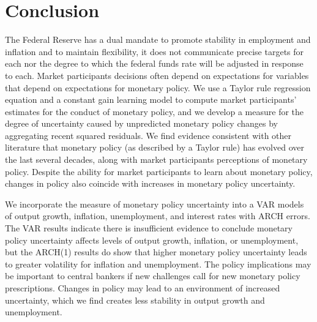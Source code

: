\documentclass[12pt]{article}
\begin{document}
\section{Conclusion}
The Federal Reserve has a dual mandate to promote stability in employment and inflation and to maintain flexibility, it does not communicate precise targets for each nor the degree to which the federal funds rate will be adjusted in response to each.  Market participants decisions often depend on expectations for variables that depend on expectations for monetary policy.  We use a Taylor rule regression equation and a constant gain learning model to compute market participants' estimates for the conduct of monetary policy, and we develop a measure for the degree of uncertainty caused by unpredicted monetary policy changes by aggregating recent squared residuals.  We find evidence consistent with other literature that monetary policy (as described by a Taylor rule) has evolved over the last several decades, along with market participants perceptions of monetary policy.  Despite the ability for market participants to learn about monetary policy, changes in policy also coincide with increases in monetary policy uncertainty.  

We incorporate the measure of monetary policy uncertainty into a VAR models of output growth, inflation, unemployment, and interest rates with ARCH errors.  The VAR results indicate there is insufficient evidence to conclude monetary policy uncertainty affects levels of output growth, inflation, or unemployment, but the ARCH(1) results do show that higher monetary policy uncertainty leads to greater volatility for inflation and unemployment.  The policy implications may be important to central bankers if new challenges call for new monetary policy prescriptions.  Changes in policy may lead to an environment of increased uncertainty, which we find creates less stability in output growth and unemployment.

\newpage
\nocite{*}


\newpage
\end{document}
